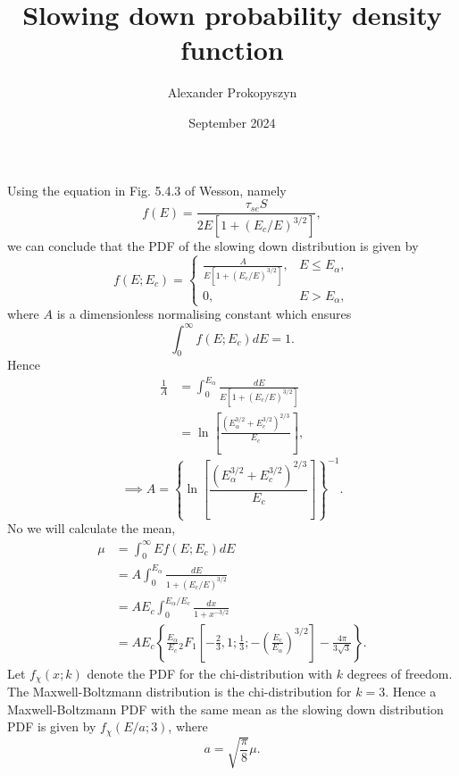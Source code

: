 \documentclass{article}
\title{Slowing down probability density function}
\author{Alexander Prokopyszyn}
\date{September 2024}
\begin{document}
\maketitle

Using the equation in Fig. 5.4.3 of Wesson, namely
\[f(E) = \frac{\tau_{se} S}{2E[1+(E_c/E)^{3/2}]},\]
we can conclude that the PDF of the slowing down distribution is given by
\[f(E; E_c)=
\begin{cases}
   \frac{A}{E[1+(E_c/E)^{3/2}]},& E\le E_\alpha, \\
   0,& E > E_\alpha,
\end{cases}
\]
where $A$ is a dimensionless normalising constant which ensures
\[\int_0^\infty f(E; E_c)dE = 1.\]
Hence
\[\begin{aligned}
\frac{1}{A} &= \int_0^{E_\alpha}\frac{dE}{E[1+(E_c/E)^{3/2}]} \\
&=\ln\left[\frac{(E_\alpha^{3/2}+E_c^{3/2})^{2/3}}{E_c}\right],
\end{aligned}\]
\[\implies A = \left\{\ln\left[\frac{(E_\alpha^{3/2}+E_c^{3/2})^{2/3}}{E_c}\right]\right\}^{-1}.\]
No we will calculate the mean,
\[\begin{aligned}
\mu &= \int_0^\infty E f(E; E_c) dE \\
&=A\int_0^{E_\alpha}\frac{dE}{1+(E_c/E)^{3/2}} \\
&= AE_c\int_0^{E_\alpha/E_c}\frac{dx}{1+x^{-
3/2}} \\
&= AE_c\left\{\frac{E_\alpha}{E_c} {}_2F_1\left[-\frac{2}{3}, 1; \frac{1}{3}; -\left(\frac{E_c}{E_\alpha}\right)^{3/2}\right] - \frac{4\pi}{3\sqrt{3}}\right\}.
\end{aligned}\]
Let $f_\chi(x; k)$ denote the PDF for the chi-distribution with $k$ degrees of freedom. The Maxwell-Boltzmann distribution is the chi-distribution for $k=3$. Hence a Maxwell-Boltzmann PDF with the same mean as the slowing down distribution PDF is given by $f_\chi(E/a;3)$, where
\[a=\sqrt{\frac{\pi}{8}}\mu.\]
\end{document}
